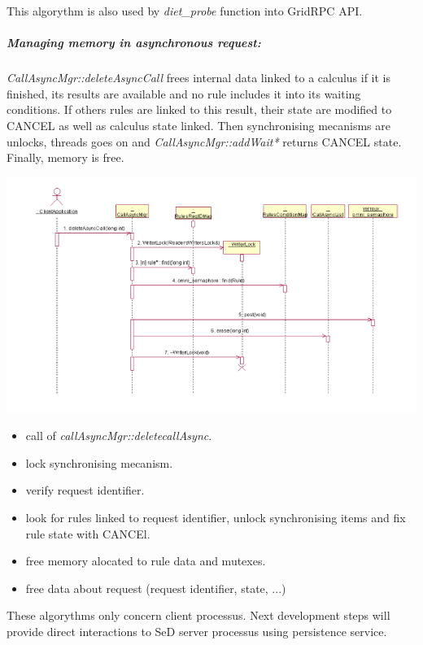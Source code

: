   \noindent
   This algorythm is also used by \emph{diet\_probe} function
  into GridRPC API.

  \subparagraph{Managing memory in asynchronous request:}
  \emph{CallAsyncMgr::deleteAsyncCall} frees internal data linked to a
  calculus if it is finished, its results are available and no rule includes
  it into its waiting conditions.
  If others rules are linked to this result, their state are modified to
  CANCEL as well as calculus state linked. Then synchronising mecanisms
  are unlocks, threads goes on and \emph{CallAsyncMgr::addWait*} returns
  CANCEL state. Finally, memory is free.

  \begin{center}
  \includegraphics{./fig/DietCancelSequenceDiagram}
  \end{center}

  \begin{itemize}
  \item call of \emph{callAsyncMgr::deletecallAsync}.
  \item lock synchronising mecanism.
  \item verify request identifier.
  \item look for rules linked to request identifier,
  unlock synchronising items and fix rule state with CANCEl.
  \item free memory alocated to rule data and mutexes.
\item free data about request (request identifier, state, ...)
  \end{itemize}

  \noindent
   These algorythms only concern client processus. Next development steps
  will provide direct interactions to SeD server processus using persistence
  service.

